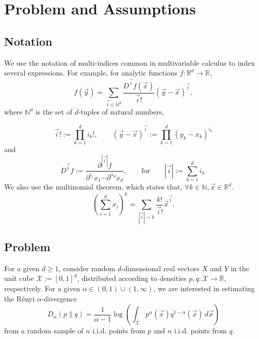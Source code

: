 \documentclass{article}
\newcommand{\N}{\mathbb{N}}                         %
\newcommand{\R}{\mathbb{R}}                         %
\newcommand{\X}{\mathcal{X}}                        %
\newcommand{\vx}{\vec{x}}                           %
\newcommand{\vy}{\vec{y}}                           %
\newcommand{\vi}{{\vec{i}}}                         %
\begin{document}



\section{Problem and Assumptions} \label{sec:Problem}

\subsection{Notation}
We use the notation of multi-indices common in multivariable calculus to index
several expressions. For example, for analytic functions $f : \R^d \to \R$,
\[f(\vy) = \sum_{\vi \in \N^d} \frac{D^\vi f(\vx)}{\vi!} (\vy - \vx)^\vi,\]
where $\N^d$ is the set of $d$-tuples of natural numbers,

\[\vi! := \prod_{k = 1}^d i_k!, \quad \quad
    (\vy - \vx)^\vi := \prod_{k = 1}^d (y_k - x_k)^{i_k}\]
and
\[
    D^\vi f := \frac{\partial^{|\vi|} f}
                   {\partial^{i_1}x_1\cdots\partial^{\alpha_d}x_d}, \quad \quad
    \mbox{for} \quad \quad
    |\vi| := \sum_{k = 1}^d i_k.
\]
We also use the multinomial theorem, which states that,
$\forall k \in \N, \vx \in \R^d$.
\begin{equation}
\label{eq:multinom}
\left( \sum_{i = 1}^d x_i \right)^k
    = \sum_{|\vi| = k} \frac{k!}{\vi!} \vx^\vi.
\end{equation}

\subsection{Problem}
For a given $d \geq 1$, consider random $d$-dimensional real vectors $X$ and
$Y$ in the unit cube $\X := [0,1]^d$, distributed according to densities
$p,q : \X \to \R$, respectively. For a given
$\alpha \in (0,1) \cup (1,\infty)$, we are interested in estimating the R\'enyi
$\alpha$-divergence
\[D_\alpha(p\|q)
    = \frac{1}{\alpha - 1}
        \log \left(
          \int_\X
            p^\alpha(\vx)q^{1 - \alpha}(\vx)
          \, d\vx
        \right)
\]
from a random sample of $n$ i.i.d. points from $p$ and $n$ i.i.d. points from
$q$. \\
\end{document}
